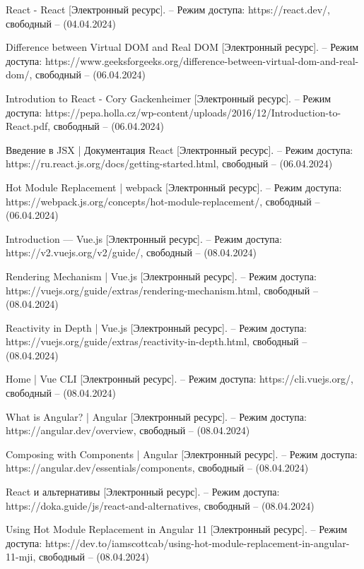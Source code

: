 \begin{thebibliography}{}
	React - React [Электронный ресурс]. – Режим доступа: https://react.dev/,
	свободный – (04.04.2024)
	
	Difference between Virtual DOM and Real DOM [Электронный ресурс]. – Режим доступа: https://www.geeksforgeeks.org/difference-between-virtual-dom-and-real-dom/,
	свободный – (06.04.2024)
	
	Introdution to React - Cory Gackenheimer [Электронный ресурс]. – Режим доступа: https://pepa.holla.cz/wp-content/uploads/2016/12/Introduction-to-React.pdf,
	свободный – (06.04.2024)
	
	Введение в JSX | Документация React [Электронный ресурс]. – Режим доступа: https://ru.react.js.org/docs/getting-started.html,
	свободный – (06.04.2024)
	
	Hot Module Replacement | webpack [Электронный ресурс]. – Режим доступа: https://webpack.js.org/concepts/hot-module-replacement/,
	свободный – (06.04.2024)
	
	Introduction --- Vue.js [Электронный ресурс]. – Режим доступа: https://v2.vuejs.org/v2/guide/,
	свободный – (08.04.2024)
	
	Rendering Mechanism | Vue.js [Электронный ресурс]. – Режим доступа: https://vuejs.org/guide/extras/rendering-mechanism.html,
	свободный – (08.04.2024)
	
	Reactivity in Depth | Vue.js [Электронный ресурс]. – Режим доступа: https://vuejs.org/guide/extras/reactivity-in-depth.html,
	свободный – (08.04.2024)

	Home  | Vue CLI [Электронный ресурс]. – Режим доступа: https://cli.vuejs.org/,
	свободный – (08.04.2024)
	
	What is Angular? | Angular [Электронный ресурс]. – Режим доступа: https://angular.dev/overview, 
	свободный – (08.04.2024)
	
	Composing with Components | Angular [Электронный ресурс]. – Режим доступа: https://angular.dev/essentials/components,
	свободный – (08.04.2024)

	React и альтернативы [Электронный ресурс]. – Режим доступа: https://doka.guide/js/react-and-alternatives, 
	свободный – (08.04.2024)
	
	Using Hot Module Replacement in Angular 11 [Электронный ресурс]. – Режим доступа: https://dev.to/iamscottcab/using-hot-module-replacement-in-angular-11-mji,
	свободный – (08.04.2024)
	

\end{thebibliography}
